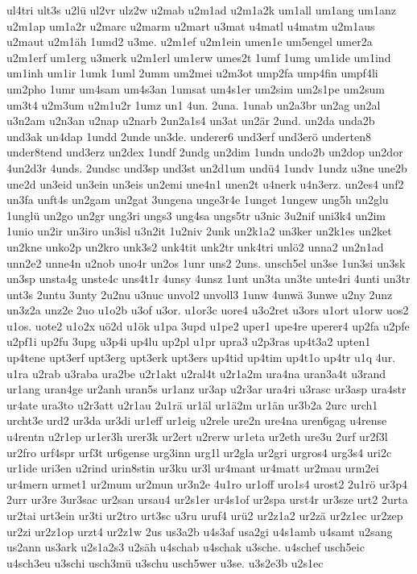 {ul4tri
ult3s
u2lü
ul2vr
ulz2w
u2mab
u2m1ad
u2m1a2k
um1all
um1ang
um1anz
u2m1ap
um1a2r
u2marc
u2marm
u2mart
u3mat
u4matl
u4matm
u2m1aus
u2maut
u2m1äh
1umd2
u3me.
u2m1ef
u2m1ein
umen1e
um5engel
umer2a
u2m1erf
um1erg
u3merk
u2m1erl
um1erw
umes2t
1umf
1umg
um1ide
um1ind
um1inh
um1ir
1umk
1uml
2umm
um2mei
u2m3ot
ump2fa
ump4fin
umpf4li
um2pho
1umr
um4sam
um4s3an
1umsat
um4s1er
um2sim
um2s1pe
um2sum
um3t4
u2m3um
u2m1u2r
1umz
un1
4un.
2una.
1unab
un2a3br
un2ag
un2al
u3n2am
u2n3an
u2nap
u2narb
2un2a1s4
un3at
un2är
2und.
un2da
unda2b
und3ak
un4dap
1undd
2unde
un3de.
underer6
und3erf
und3erö
underten8
under8tend
und3erz
un2dex
1undf
2undg
un2dim
1undn
undo2b
un2dop
un2dor
4un2d3r
4unds.
2undsc
und3sp
und3st
un2d1um
undü4
1undv
1undz
u3ne
une2b
une2d
un3eid
un3ein
un3eis
un2emi
une4n1
unen2t
u4nerk
u4n3erz.
un2es4
unf2
un3fa
unft4s
un2gam
un2gat
3ungena
unge3r4e
1unget
1ungew
ung5h
un2glu
1unglü
un2go
un2gr
ung3ri
ungs3
ung4sa
ungs5tr
u3nic
3u2nif
uni3k4
un2im
1unio
un2ir
un3iro
un3isl
u3n2it
1u2niv
2unk
un2k1a2
un3ker
un2k1es
un2ket
un2kne
unko2p
un2kro
unk3s2
unk4tit
unk2tr
unk4tri
unlö2
unna2
un2n1ad
unn2e2
unne4n
u2nob
uno4r
un2os
1unr
uns2
2uns.
unsch5el
un3se
1un3si
un3sk
un3sp
unsta4g
unste4c
uns4t1r
4unsy
4unsz
1unt
un3ta
un3te
unte4ri
4unti
un3tr
unt3s
2untu
3unty
2u2nu
u3nuc
unvol2
unvoll3
1unw
4unwä
3unwe
u2ny
2unz
un3z2a
unz2e
2uo
u1o2b
u3of
u3or.
u1or3c
uore4
u3o2ret
u3ors
u1ort
u1orw
uos2
u1os.
uote2
u1o2x
uö2d
u1ök
u1pa
3upd
u1pe2
uper1
upe4re
uperer4
up2fa
u2pfe
u2pf1i
up2fu
3upg
u3p4i
up4lu
up2pl
u1pr
upra3
u2p3ras
up4t3a2
upten1
up4tene
upt3erf
upt3erg
upt3erk
upt3ers
up4tid
up4tim
up4t1o
up4tr
u1q
4ur.
u1ra
u2rab
u3raba
ura2be
u2r1akt
u2ral4t
u2r1a2m
ura4na
uran3a4t
u3rand
ur1ang
uran4ge
ur2anh
uran5s
ur1anz
ur3ap
u2r3ar
ura4ri
u3rasc
ur3asp
ura4str
ur4ate
ura3to
u2r3att
u2r1au
2u1rä
ur1äl
ur1ä2m
ur1än
ur3b2a
2urc
urch1
urcht3e
urd2
ur3da
ur3di
ur1eff
ur1eig
u2rele
ure2n
ure4na
uren6gag
u4rense
u4rentn
u2r1ep
ur1er3h
urer3k
ur2ert
u2rerw
ur1eta
ur2eth
ure3u
2urf
ur2f3l
ur2fro
urf4spr
urf3t
ur6gense
urg3inn
urg1l
ur2gla
ur2gri
urgros4
urg3s4
uri2c
ur1ide
uri3en
u2rind
urin8stin
ur3ku
ur3l
ur4mant
ur4matt
ur2mau
urm2ei
ur4mern
urmet1
ur2mum
ur2mun
ur3n2e
4u1ro
ur1off
uro1s4
urost2
2u1rö
ur3p4
2urr
ur3re
3ur3sac
ur2san
ursau4
ur2s1er
ur4s1of
ur2spa
urst4r
ur3sze
urt2
2urta
ur2tai
urt3ein
ur3ti
ur2tro
urt3sc
u3ru
uruf4
urü2
ur2z1a2
ur2zä
ur2z1ec
ur2zep
ur2zi
ur2z1op
urzt4
ur2z1w
2us
us3a2b
u4s3af
usa2gi
u4s1amb
u4samt
u2sang
us2ann
us3ark
u2s1a2s3
u2säh
u4schab
u4schak
u3sche.
u4schef
usch5eic
u4sch3eu
u3schi
usch3mü
u3schu
usch5wer
u3se.
u3s2e3b
u2s1ec
}
